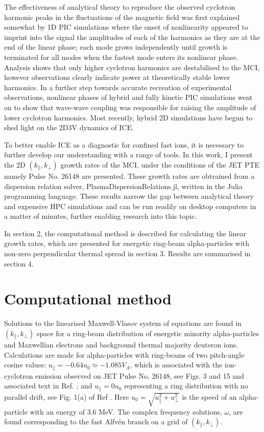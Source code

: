\documentclass[12pt]{iopart}
\begin{document}
The effectiveness of analytical theory to reproduce the observed cyclotron harmonic peaks in the fluctuations of the magnetic field was first explained somewhat by 1D PIC simulations where the onset of nonlinearity appeared to imprint into the signal the amplitudes of each of the harmonics as they are at the end of the linear phase; each mode grows independently until growth is terminated for all modes when the fastest mode enters its nonlinear phase. Analysis shows that only higher cyclotron harmonics are destabilised\cite{McClements2015} to the MCI, however observations clearly indicate power at theoretically stable lower harmonics\cite{Cottrell1988}. In a further step towards accurate recreation of experimental observations, nonlinear phases of hybrid\cite{Carbajal2014} and fully kinetic\cite{Cook2013,Chapman2017} PIC simulations went on to show that wave-wave coupling was responsible for raising the amplitude of lower cyclotron harmonics. Most recently, hybrid 2D simulations have begun to shed light on the 2D3V dynamics of ICE\cite{Carbajal2021}.

To better enable ICE as a diagnostic for confined fast ions, it is necessary to further develop our understanding with a range of tools. In this work, I present the 2D $(k_\parallel, k_\perp)$ growth rates of the MCI, under the conditions of the JET PTE\cite{Cottrell1993} namely Pulse No. 26148 are presented. These growth rates are obtrained from a dispersion relation solver, PlasmaDispersionRelations.jl, written in the Julia programming language\cite{Bezanson2017}. These results narrow the gap between analytical theory and expensive HPC simulations and can be run readily on desktop computers in a matter of minutes, further enabling research into this topic. 

In section 2, the computational method is described for calculating the linear growth rates, which are presented for energetic ring-beam alpha-particles with non-zero perpendicular thermal spread in section 3. Results are summarised in section 4.

\section{Computational method}

Solutions to the linearised Maxwell-Vlasov system of equations are found in $(k_\parallel, k_\bot)$ space for a ring-beam distribution of energetic minority alpha-particles and Maxwellian electrons and background thermal majority deuteron ions. Calculations are made for alpha-particles with ring-beams of two pitch-angle cosine values: $u_\parallel=-0.64 u_0 \simeq -1.085 V_A$, which is associated with the ion-cyclotron emission observed on JET Pulse No. 26148, see Figs. 3 and 15 and associated text in Ref. \cite{Cottrell1993}; and $u_\parallel=0 u_0$ representing a ring distribution with no parallel drift, see Fig. 1(a) of Ref \cite{Cook2013}. Here $u_0=\sqrt{u_\parallel^2 + u_\perp^2}$ is the speed of an alpha-particle with an energy of 3.6 MeV. The complex frequency solutions, $\omega$, are found corresponding to the fast Alfv{\'e}n branch on a grid of $(k_\parallel, k_\bot)$. 
\end{document}
